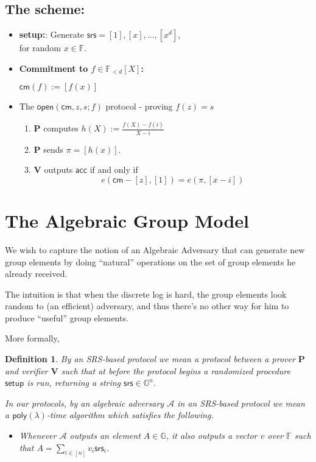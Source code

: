 \documentclass[11pt]{article} %
\newcommand{\G}{\ensuremath{{\mathbb G}}\xspace}
\newcommand{\F}{\ensuremath{\mathbb F}\xspace}
\newcommand{\adv}{\ensuremath{\mathcal A}\xspace}
\newcommand{\srs}{\ensuremath{\mathsf{srs}}\xspace}
\newcommand{\setup}{\ensuremath{\mathsf{setup}}\xspace}
\newcommand{\cm}{\ensuremath{\mathsf{cm}}\xspace}
\newcommand{\open}{\ensuremath{\mathsf{open}}\xspace}
\newcommand{\acc}{\ensuremath{\mathsf{acc}}\xspace}
\newcommand{\defeq}{:=}
\newcommand{\enc}[1]{\ensuremath{\left[#1\right]}\xspace}
\newcommand{\prv}{\ensuremath{\mathsf{\mathbf{P}}}\xspace}
\newcommand{\prf}{\ensuremath{\pi}\xspace}
\newcommand{\ver}{\ensuremath{\mathsf{\mathbf{V}}}\xspace}
\newcommand{\polysofdeg}[1]{\ensuremath{\F_{< #1}[X]}\xspace}
\newtheorem{dfn}[lemma]{Definition}
\newcommand{\poly}{\ensuremath{\mathsf{poly(\lambda)}}\xspace}
\begin{document}
\subsection{The scheme:}
\begin{itemize}
 \item 
 \textbf{setup:}: Generate $\srs= \enc{1},\enc{x},\ldots,\enc{x^d}$,\\
 for random $x\in \F$.
 \item\textbf{Commitment to $f\in\polysofdeg{d}$:}


 $\cm(f)\defeq   \enc{f(x)}$\\
 \item The $\open(\cm,z,s;f)$ protocol  - proving $f(z)=s$ 
\begin{enumerate}
 \item \prv computes 
 $h(X)\defeq \frac{f(X)-f(i)}{X-i}$\\
 \item \prv sends $\prf=[h(x)]$.
 \item \ver outputs \acc if and only if 
\[e(\cm-\enc{z},\enc{1}) = e(\prf, \enc{x-i})\]
\end{enumerate}
\end{itemize}

\section{The Algebraic Group Model}
We wish to capture the notion of an Algebraic Adversary that can generate new group elements by doing ``natural'' operations on the set
of group elements he already received.

The intuition is that when the discrete log is hard, the group elements look random to (an efficient) adversary, and thus there's no other way for him
to produce ``useful'' group elements.


More formally,
\begin{dfn}
 By an \emph{SRS-based protocol} we mean a protocol between a prover \prv and verifier \ver such that at
 before the protocol begins a randomized procedure \setup is run, returning a string $\srs \in \G^n$.

In our protocols, by an \emph{algebraic adversary} \adv in an SRS-based protocol we mean a \poly-time algorithm which satisfies the following.
\begin{itemize}
 \item Whenever \adv outputs an element $A\in \G$, it also outputs a vector $v$ over \F such that $A = \sum_{i\in [n]}v_i \srs _i$.
\end{itemize}
\end{dfn}
\end{document}
